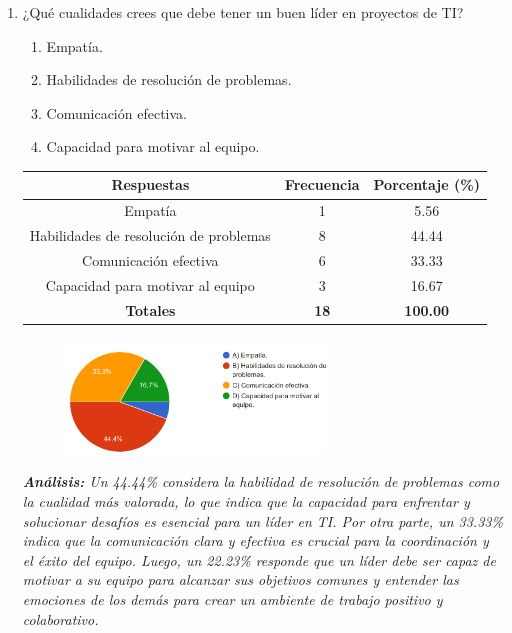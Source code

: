 \documentclass[journal]{IEEEtran}
\begin{document}
\begin{enumerate}
	\item ¿Qué cualidades crees que debe tener un buen líder en proyectos de TI?
	\begin{enumerate}
		\item Empatía.
		\item Habilidades de resolución de problemas.
		\item Comunicación efectiva.
		\item Capacidad para motivar al equipo.
	\end{enumerate}
	\begin{table}[H]
		\renewcommand{\arraystretch}{1.3}
		\centering
		\begin{tabular}{|c|c|c|}
			\hline
			\textbf{Respuestas} & \textbf{Frecuencia} & \textbf{Porcentaje (\%)}\\
			\hline
			Empatía & 1 & 5.56\\
			Habilidades de resolución de problemas & 8 & 44.44\\
			Comunicación efectiva & 6 & 33.33\\
			Capacidad para motivar al equipo & 3 & 16.67\\
			\hline
			\textbf{Totales} &\textbf{18}& \textbf{100.00}\\
			\hline
		\end{tabular}
	\end{table}
	\begin{figure}[h]
		\centering
		\includegraphics[width=07cm]{Pregunta17}
	\end{figure}
	\textit{\textbf{Análisis:} Un 44.44\% considera la habilidad de resolución de problemas como la cualidad más valorada, lo que indica que la capacidad para enfrentar y solucionar desafíos es esencial para un líder en TI. Por otra parte, un 33.33\% indica que la comunicación clara y efectiva es crucial para la coordinación y el éxito del equipo. Luego, un 22.23\% responde que un líder debe ser capaz de motivar a su equipo para alcanzar sus objetivos comunes y entender las emociones de los demás para crear un ambiente de trabajo positivo y colaborativo.}\\
		

\end{enumerate}
\end{document}
